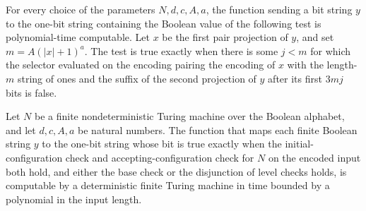 \begin{theorem}
\label{Complexity.TQBFHard.pt_orB}
\leanok
{}
For every choice of the parameters $N,d,c,A,a$, the function sending a bit string $y$ to
the one-bit string containing the Boolean value of the following test is polynomial-time
computable. Let $x$ be the first pair projection of $y$, and set $m=A(|x|+1)^a$. The
test is true exactly when there is some $j<m$ for which the selector evaluated on the
encoding pairing the encoding of $x$ with the length-$m$ string of ones and the suffix
of the second projection of $y$ after its first $3mj$ bits is false.
\end{theorem}

\begin{theorem}
\label{Complexity.TQBFHard.polyTimeComputable_predB}
\leanok
{}
Let $N$ be a finite nondeterministic Turing machine over the Boolean alphabet, and let
$d,c,A,a$ be natural numbers. The function that maps each finite Boolean string $y$ to
the one-bit string whose bit is true exactly when the initial-configuration check and
accepting-configuration check for $N$ on the encoded input both hold, and either the
base check or the disjunction of level checks holds, is computable by a deterministic
finite Turing machine in time bounded by a polynomial in the input length.
\end{theorem}
